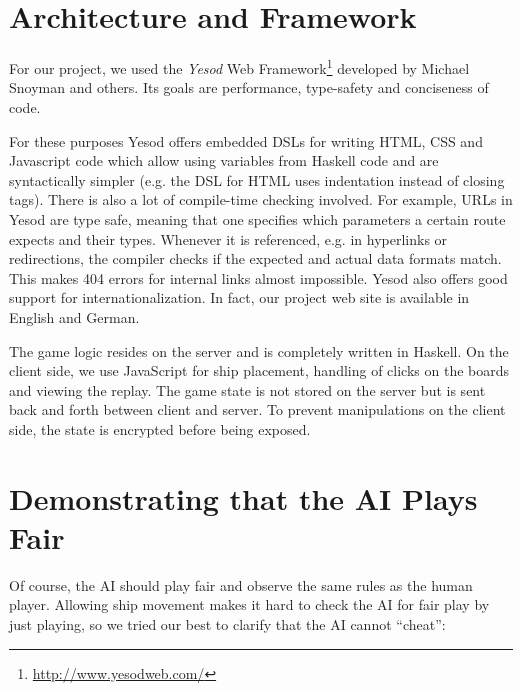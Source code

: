 \documentclass[a4paper]{easychair}
\begin{document}
\section{Architecture and Framework}

For our project, we used the \emph{Yesod} Web Framework\footnote{\url{http://www.yesodweb.com/}} developed by Michael Snoyman and others. Its goals are performance, type-safety and conciseness of code.

For these purposes Yesod offers embedded DSLs for writing HTML, CSS and Javascript code which allow using variables from Haskell code and are syntactically simpler (e.g. the DSL for HTML uses indentation instead of closing tags). There is also a lot of compile-time checking involved. For example, URLs in Yesod are type safe, meaning that one specifies which parameters a certain route expects and their types. Whenever it is referenced, e.g. in hyperlinks or redirections, the compiler checks if the expected and actual data formats match. This makes 404 errors for internal links almost impossible. Yesod also offers good support for internationalization. In fact, our project web site is available in English and German.

The game logic resides on the server and is completely written in Haskell. On the client side, we use JavaScript for ship placement, handling of clicks on the boards and viewing the replay. The game state is not stored on the server but is sent back and forth between client and server. To prevent manipulations on the client side, the state is encrypted before being exposed. %

\section{Demonstrating that the AI Plays Fair}
\label{sect:fair-play}
Of course, the AI should play fair and observe the same rules as the human player. Allowing ship movement makes it hard to check the AI for fair play by just playing, so we tried our best to clarify that the AI cannot ``cheat'':
\end{document}
